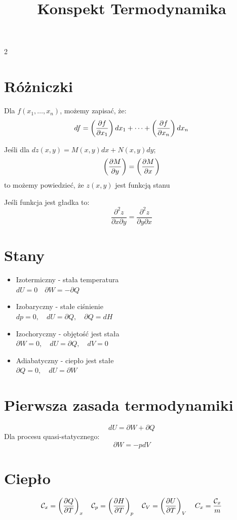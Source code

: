 \documentclass{../konspekt}
\title{Konspekt Termodynamika}
\begin{document}
\begin{multicols}{2}

  \section{Różniczki}

  Dla $f(x_1, \dots, x_n)$, możemy zapisać, że:
  $$
  df = \left(\frac{\partial f}{\partial x_1}\right) dx_1 + \dots + \left(\frac{\partial f}{\partial x_n}\right) dx_n
  $$

  Jeśli dla $dz(x, y) = M(x, y)dx + N(x, y)dy$;
  $$
  \left(\frac{\partial M}{\partial y}\right) = \left(\frac{\partial M}{\partial x}\right)
  $$
  to możemy powiedzieć, że $z(x, y)$ jest funkcją stanu

  Jeśli funkcja jest gładka to:
  $$
  \frac{\partial^2 z}{\partial x \partial y} = \frac{\partial^2
  z}{\partial y \partial x}
  $$
  \vspace{-2em}

  \section{Stany}

  \begin{itemize}
    \item Izotermiczny - stała temperatura \\
      $dU = 0 \quad \partial W = - \partial Q$
    \item Izobaryczny - stałe ciśnienie \\
      $dp = 0, \quad dU = \partial Q, \quad \partial Q = dH$
    \item Izochoryczny - objętość jest stała\\
      $\partial W = 0, \quad dU = \partial Q, \quad dV = 0$
    \item Adiabatyczny - ciepło jest stałe\\
      $\partial Q = 0, \quad dU = \partial W$
  \end{itemize}
  \vspace{-2em}

  \section{Pierwsza zasada termodynamiki}
  $$
  dU = \partial W + \partial Q
  $$
  Dla procesu quasi-statycznego:
  $$
  \partial W = -pdV
  $$
  \vspace{-4em}

  \section{Ciepło}
  $$
  \mathcal{C}_x = \left(\frac{\partial Q}{\partial T}\right)_x \quad \mathcal{C}_p = \left(\frac{\partial H}{\partial T}\right)_p \quad
  \mathcal{C}_V = \left(\frac{\partial U}{\partial T}\right)_V \quad C_x = \frac{\mathcal{C}_x}{m}
  $$
  \vspace{-2em}


\end{multicols}
\end{document}
